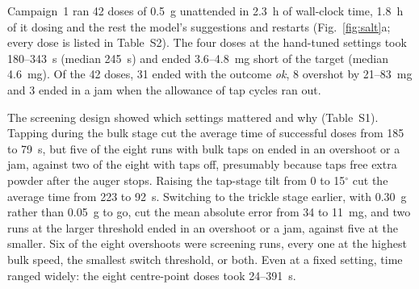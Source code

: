 \documentclass[preprint,12pt]{elsarticle}
\begin{document}
Campaign~1 ran 42 doses of 0.5~g unattended in 2.3~h of wall-clock time, 1.8~h of it dosing and the rest the model's suggestions and restarts (Fig.~\ref{fig:salt}a; every dose is listed in Table~S2). The four doses at the hand-tuned settings took 180--343~s (median 245~s) and ended 3.6--4.8~mg short of the target (median 4.6~mg). Of the 42 doses, 31 ended with the outcome \emph{ok}, 8 overshot by 21--83~mg and 3 ended in a jam when the allowance of tap cycles ran out.

The screening design showed which settings mattered and why (Table~S1). Tapping during the bulk stage cut the average time of successful doses from 185 to 79~s, but five of the eight runs with bulk taps on ended in an overshoot or a jam, against two of the eight with taps off, presumably because taps free extra powder after the auger stops. Raising the tap-stage tilt from 0 to 15$^\circ$ cut the average time from 223 to 92~s. Switching to the trickle stage earlier, with 0.30~g rather than 0.05~g to go, cut the mean absolute error from 34 to 11~mg, and two runs at the larger threshold ended in an overshoot or a jam, against five at the smaller. Six of the eight overshoots were screening runs, every one at the highest bulk speed, the smallest switch threshold, or both. Even at a fixed setting, time ranged widely: the eight centre-point doses took 24--391~s.
\end{document}
